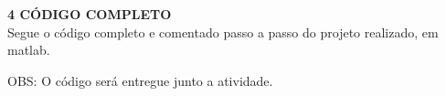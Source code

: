 \noindent \textcolor{myBlue}{\textbf{\large{4 CÓDIGO COMPLETO }}}\\

Segue o código completo e comentado  passo a passo do projeto realizado, em matlab.



\noindent OBS: O código será entregue junto a atividade. \\